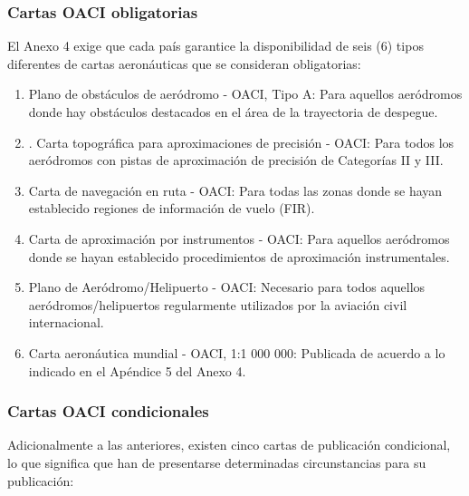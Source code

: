 \subsubsection{Cartas OACI obligatorias}

El Anexo 4 exige que cada pa\'is garantice la disponibilidad de seis (6) 
tipos diferentes de cartas aeron\'auticas que se consideran obligatorias:

\begin{enumerate}

\item   Plano de obst\'aculos de aer\'odromo - OACI, Tipo A: Para aquellos
  aer\'odromos donde hay obst\'aculos destacados en el \'area de la
  \gls{trayectoria} de despegue.

  \item. Carta topogr\'afica para aproximaciones de precisi\'on - OACI: Para
  todos los aer\'odromos con pistas de aproximaci\'on de precisi\'on de
  Categor\'ias II y III.

  \item Carta de navegaci\'on en ruta - OACI: Para todas las zonas donde se
  hayan establecido regiones de informaci\'on de vuelo (FIR).

  \item Carta de aproximaci\'on por instrumentos - OACI: Para aquellos
  aer\'odromos donde se hayan establecido procedimientos de aproximaci\'on
  instrumentales.

  \item Plano de Aer\'odromo/Helipuerto - OACI: Necesario para todos
  aquellos aer\'odromos/helipuertos regularmente utilizados por la
  aviaci\'on civil internacional.

  \item Carta aeron\'autica mundial - OACI, 1:1 000 000: Publicada de
  acuerdo a lo indicado en el Ap\'endice 5 del Anexo 4.
\end{enumerate}

\subsubsection{Cartas OACI condicionales}

Adicionalmente a las anteriores, existen cinco cartas de publicaci\'on condicional, lo que significa que han de presentarse determinadas circunstancias para su publicaci\'on:

